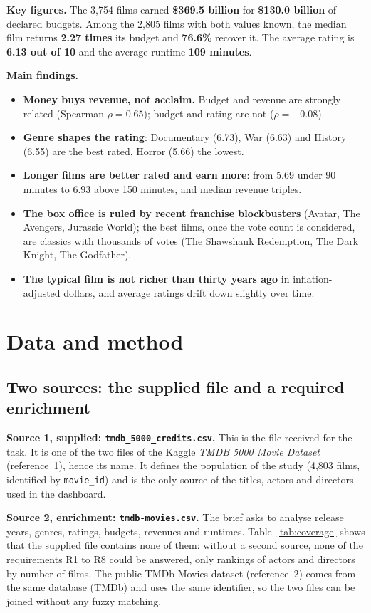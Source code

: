 \documentclass[12pt,a4paper]{article}
\begin{document}
\textbf{Key figures.} The 3{,}754 films earned \textbf{\$369.5 billion} for
\textbf{\$130.0 billion} of declared budgets. Among the 2{,}805 films with both values
known, the median film returns \textbf{2.27 times} its budget and \textbf{76.6\%}
recover it. The average rating is \textbf{6.13 out of 10} and the average runtime
\textbf{109 minutes}.

\textbf{Main findings.}
\begin{itemize}
\item \textbf{Money buys revenue, not acclaim.} Budget and revenue are strongly
related (Spearman $\rho = 0.65$); budget and rating are not ($\rho = -0.08$).
\item \textbf{Genre shapes the rating}: Documentary (6.73), War (6.63) and History
(6.55) are the best rated, Horror (5.66) the lowest.
\item \textbf{Longer films are better rated and earn more}: from 5.69 under 90 minutes to
6.93 above 150 minutes, and median revenue triples.
\item \textbf{The box office is ruled by recent franchise blockbusters} (Avatar,
The Avengers, Jurassic World); the best films, once the vote count is considered, are
classics with thousands of votes (The Shawshank Redemption, The Dark Knight, The
Godfather).
\item \textbf{The typical film is not richer than thirty years ago} in inflation-adjusted
dollars, and average ratings drift down slightly over time.
\end{itemize}

\section{Data and method}

\subsection{Two sources: the supplied file and a required enrichment}

\textbf{Source 1, supplied: \texttt{tmdb\_5000\_credits.csv}.} This is the file received
for the task. It is one of the two files of the Kaggle \emph{TMDB 5000 Movie Dataset}
(reference~1), hence its name. It defines the population of the study (4{,}803 films,
identified by \texttt{movie\_id}) and is the only source of the titles, actors and
directors used in the dashboard.

\textbf{Source 2, enrichment: \texttt{tmdb-movies.csv}.} The brief asks to analyse
release years, genres, ratings, budgets, revenues and runtimes. Table~\ref{tab:coverage}
shows that the supplied file contains none of them: without a second source, none of the
requirements R1 to R8 could be answered, only rankings of actors and directors by number
of films. The public TMDb Movies dataset
(reference~2) comes from the same database (TMDb) and uses the same identifier, so the
two files can be joined without any fuzzy matching.
\end{document}
